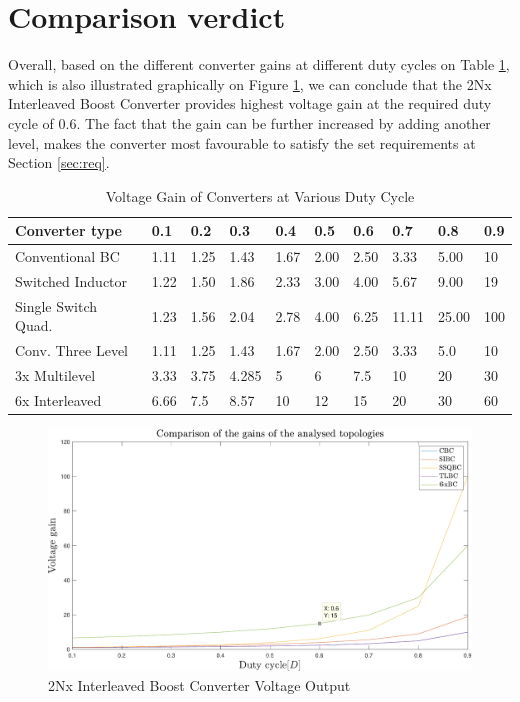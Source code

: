 \section{Comparison verdict}\label{ch:VERD}

Overall, based on the different converter gains at different duty cycles on Table \ref{tab:2NX_Overall}, which is also illustrated graphically on Figure \ref{fig:2Nx_Overall_Graph}, we can conclude that the 2Nx Interleaved Boost Converter provides highest voltage gain at the required duty cycle of 0.6. The fact that the gain can be further increased by adding another level, makes the converter most favourable to satisfy the set requirements at Section \ref{sec:req}. 

\begin{table}[H]
\begin{center}
\caption {Voltage Gain of Converters at Various Duty Cycle} \label{tab:2NX_Overall} 
\begin{tabular}{|l|l|l|l|l|l|l|l|l|l|}
\hline
\textbf{Converter type} & \textbf{0.1} & \textbf{0.2} & \textbf{0.3} & \textbf{0.4} & \textbf{0.5} & \textbf{0.6} & \textbf{0.7} & \textbf{0.8} & \textbf{0.9} \\ \hline
Conventional BC        &      1.11   &      1.25   &   1.43   &      1.67   &      2.00    &      2.50  &      3.33   &     5.00  &   10 \\ \hline
Switched Inductor   & 1.22      &      1.50   &      1.86   &      2.33   &     3.00    &     4.00    &      5.67     &    9.00   &      19\\ \hline
Single Switch Quad.        &       1.23     &      1.56      &      2.04   &      2.78   &      4.00   &      6.25   &      11.11   &      25.00   &      100 \\ \hline
Conv. Three Level          & 1.11   &      1.25   &   1.43   &      1.67   &      2.00    &      2.50  &      3.33   &     5.0  &   10\\ \hline
3x Multilevel         &     3.33       &      3.75   &     4.285   &      5   &      6   &      7.5   &      10   &      20   &      30   \\ \hline
6x Interleaved         &     6.66       &      7.5   &      8.57   &      10   &      12   &      15   &      20   &      30   &      60   \\ \hline
\end{tabular}
\end{center}
\end{table}

\begin{figure}[H]
   \centering
   \includegraphics[width=\textwidth]{figures/gains.pdf}
    \caption{2Nx Interleaved Boost Converter Voltage Output}
	\label{fig:2Nx_Overall_Graph}
\end{figure}